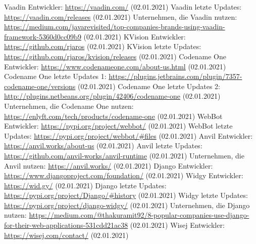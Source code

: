 \documentclass[ngerman]{article}
\begin{document}
\begin{thebibliography}{9}
        Vaadin Entwickler: \url{https://vaadin.com/} (02.01.2021)
        Vaadin letzte Updates: \url{https://vaadin.com/releases} (02.01.2021)
        Unternehmen, die Vaadin nutzen: \url{https://medium.com/javarevisited/top-companies-brands-using-vaadin-framework-5360d0cc09b9} (02.01.2021)
        KVision Entwickler: \url{https://github.com/rjaros} (02.01.2021)
        KVision letzte Updates: \url{https://github.com/rjaros/kvision/releases} (02.01.2021)
        Codename One Entwickler: \url{https://www.codenameone.com/about-us.html} (02.01.2021)
        Codename One letzte Updates 1: \url{https://plugins.jetbrains.com/plugin/7357-codename-one/versions} (02.01.2021)
        Codename One letzte Updates 2: \url{http://plugins.netbeans.org/plugin/42406/codename-one} (02.01.2021)
        Unternehmen, die Codename One nutzen: \url{https://enlyft.com/tech/products/codename-one} (02.01.2021)
        WebBot Entwickler: \url{https://pypi.org/project/webbot/} (02.01.2021)
        WebBot letzte Updates: \url{https://pypi.org/project/webbot/#files} (02.01.2021)
        Anvil Entwickler: \url{https://anvil.works/about-us} (02.01.2021)
        Anvil letzte Updates: \url{https://github.com/anvil-works/anvil-runtime} (02.01.2021)
        Unternehmen, die Anvil nutzen: \url{https://anvil.works/} (02.01.2021)
        Django Entwickler: \url{https://www.djangoproject.com/foundation/} (02.01.2021)
        Widgy Entwickler: \url{https://wid.gy/} (02.01.2021)
        Django letzte Updates: \url{https://pypi.org/project/Django/#history} (02.01.2021)
        Widgy letzte Updates: \url{https://pypi.org/project/django-widgy/} (02.01.2021)
        Unternehmen, die Django nutzen: \url{https://medium.com/@thakuramit92/8-popular-companies-use-django-for-their-web-applications-531cdd21ac38} (02.01.2021)
        Wisej Entwickler: \url{https://wisej.com/contact/} (02.01.2021)

\end{thebibliography}
\end{document}
